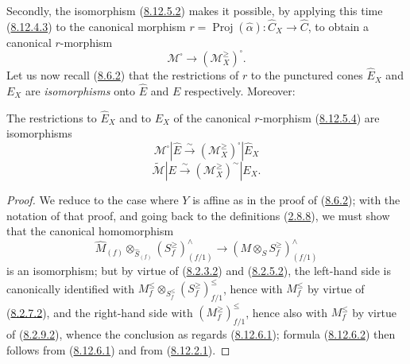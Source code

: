 \begin{env}[8.12.5]
Secondly, the isomorphism (\hyperref[II.8.12.5.2]{8.12.5.2}) makes it
possible, by applying this time (\hyperref[II.8.12.4.3]{8.12.4.3}) to the
canonical morphism $r=\operatorname{Proj}(\widehat{\alpha}):\widehat{C}_X\to
\widehat{C}$, to obtain a canonical $r$-morphism
\begin{equation}
\label{II.8.12.5.4}
  \mathcal{M}^{\square}\to(\mathcal{M}_X^{\geq})^{\square}.
\tag{8.12.5.4}
\end{equation}
Let us now recall (\hyperref[II.8.6.2]{8.6.2}) that the restrictions of
$r$ to the punctured cones $\widehat{E}_X$ and $E_X$ are \emph{isomorphisms}
onto $\widehat{E}$ and $E$ respectively. Moreover:
\end{env}

\begin{proposition}[8.12.6]
\label{II.8.12.6}
The restrictions to $\widehat{E}_X$ and to $E_X$ of the canonical $r$-morphism
(\hyperref[II.8.12.5.4]{8.12.5.4}) are isomorphisms
\begin{equation}
\label{II.8.12.6.1}
  \mathcal{M}^{\square}|\widehat{E}
  \xrightarrow{\sim}(\mathcal{M}_X^{\geq})^{\square}|\widehat{E}_X
\tag{8.12.6.1}
\end{equation}
\begin{equation}
\label{II.8.12.6.2}
  \widetilde{\mathcal{M}}|E
  \xrightarrow{\sim}(\mathcal{M}_X^{\geq})^{\sim}|E_X.
\tag{8.12.6.2}
\end{equation}
\end{proposition}

\begin{proof}
We reduce to the case where $Y$ is affine as in the proof of
(\hyperref[II.8.6.2]{8.6.2}); with the notation of that proof, and
going back to the definitions (\hyperref[II.2.8.8]{2.8.8}), we must
show that the canonical homomorphism
\[
  \widehat{M}_{(f)}\otimes_{\widehat{S}_{(f)}}
  (S_f^{\geq})_{(f/1)}^{\wedge}
  \to(M\otimes_S S_f^{\geq})_{(f/1)}^{\wedge}
\]
is an isomorphism; but by virtue of
(\hyperref[II.8.2.3.2]{8.2.3.2}) and
(\hyperref[II.8.2.5.2]{8.2.5.2}), the left-hand side is canonically
identified with
$M_f^{\leq}\otimes_{S_f^{\leq}}(S_f^{\geq})_{f/1}^{\leq}$, hence with
$M_f^{\leq}$ by virtue of (\hyperref[II.8.2.7.2]{8.2.7.2}), and the
right-hand side with $(M_f^{\geq})_{f/1}^{\leq}$, hence also with $M_f^{\leq}$
by virtue of (\hyperref[II.8.2.9.2]{8.2.9.2}), whence the conclusion as
regards (\hyperref[II.8.12.6.1]{8.12.6.1}); formula
(\hyperref[II.8.12.6.2]{8.12.6.2}) then follows from
(\hyperref[II.8.12.6.1]{8.12.6.1}) and from
(\hyperref[II.8.12.2.1]{8.12.2.1}).
\end{proof}

